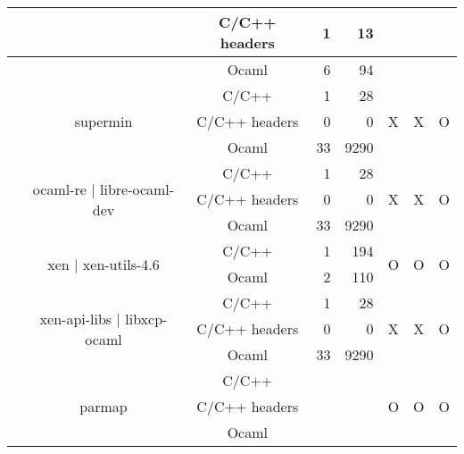 \documentclass[11pt,a4paper]{article}
\begin{document}
\begin{table}[h,t]
\begin{tabular}{|>{\centering}m{3cm}| c|c|r|r| c| c|c|}
\cline{3-5}
& &                           C/C++ headers & 1 & 13 & & & \\
\cline{3-5}
& &                          Ocaml & 6 & 94 & & & \\
\cline{2-8}





 &\multirow{3}{3cm}{supermin} & C/C++ & 1 & 28 & \multirow{3}{*}{X} & \multirow{3}{*}{X} & \multirow{3}{*}{O}\\
 \cline{3-5}
 & &                           C/C++ headers & 0 & 0 & & & \\
 \cline{3-5}
 & &                          Ocaml & 33& 9290 & & & \\
 \cline{2-8}





 &\multirow{3}{3cm}{ocaml-re | libre-ocaml-dev} & C/C++ & 1 & 28 & \multirow{3}{*}{X} & \multirow{3}{*}{X} & \multirow{3}{*}{O}\\
 \cline{3-5}
 & &                           C/C++ headers & 0 & 0 & & & \\
 \cline{3-5}
 & &                          Ocaml & 33& 9290 & & & \\
 \cline{2-8}

 &\multirow{2}{3cm}{xen | xen-utils-4.6} & C/C++ & 1 & 194  & \multirow{2}{*}{O} & \multirow{2}{*}{O} &

 \multirow{2}{*}{O}\\
 \cline{3-5}   
 &                                  & Ocaml & 2 & 110  & & & \\       
 \cline{2-8}


&\multirow{3}{3cm}{xen-api-libs | libxcp-ocaml} & C/C++ & 1 & 28 & \multirow{3}{*}{X} & \multirow{3}{*}{X} & \multirow{3}{*}{O}\\
 \cline{3-5}
 & &                           C/C++ headers & 0 & 0 & & & \\
 \cline{3-5}
 & &                          Ocaml & 33& 9290 & & & \\
 \cline{2-8}

 &\multirow{3}{*}{parmap} & C/C++ &  &  & \multirow{3}{*}{O} & \multirow{3}{*}{O} & \multirow{3}{*}{O}\\
 \cline{3-5}
 & &                           C/C++ headers &  &  & & & \\
 \cline{3-5}
 & &                          Ocaml & &  & & & \\
 \hline



 

 
\end{tabular}
\end{table}
\end{document}
